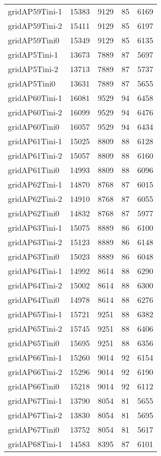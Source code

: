\begin{longtable}{lrrrr}
gridAP59Tini-1 & 15383 & 9129 & 85 & 6169 \\
gridAP59Tini-2 & 15411 & 9129 & 85 & 6197 \\
gridAP59Tini0 & 15349 & 9129 & 85 & 6135 \\
gridAP5Tini-1 & 13673 & 7889 & 87 & 5697 \\
gridAP5Tini-2 & 13713 & 7889 & 87 & 5737 \\
gridAP5Tini0 & 13631 & 7889 & 87 & 5655 \\
gridAP60Tini-1 & 16081 & 9529 & 94 & 6458 \\
gridAP60Tini-2 & 16099 & 9529 & 94 & 6476 \\
gridAP60Tini0 & 16057 & 9529 & 94 & 6434 \\
gridAP61Tini-1 & 15025 & 8809 & 88 & 6128 \\
gridAP61Tini-2 & 15057 & 8809 & 88 & 6160 \\
gridAP61Tini0 & 14993 & 8809 & 88 & 6096 \\
gridAP62Tini-1 & 14870 & 8768 & 87 & 6015 \\
gridAP62Tini-2 & 14910 & 8768 & 87 & 6055 \\
gridAP62Tini0 & 14832 & 8768 & 87 & 5977 \\
gridAP63Tini-1 & 15075 & 8889 & 86 & 6100 \\
gridAP63Tini-2 & 15123 & 8889 & 86 & 6148 \\
gridAP63Tini0 & 15023 & 8889 & 86 & 6048 \\
gridAP64Tini-1 & 14992 & 8614 & 88 & 6290 \\
gridAP64Tini-2 & 15002 & 8614 & 88 & 6300 \\
gridAP64Tini0 & 14978 & 8614 & 88 & 6276 \\
gridAP65Tini-1 & 15721 & 9251 & 88 & 6382 \\
gridAP65Tini-2 & 15745 & 9251 & 88 & 6406 \\
gridAP65Tini0 & 15695 & 9251 & 88 & 6356 \\
gridAP66Tini-1 & 15260 & 9014 & 92 & 6154 \\
gridAP66Tini-2 & 15296 & 9014 & 92 & 6190 \\
gridAP66Tini0 & 15218 & 9014 & 92 & 6112 \\
gridAP67Tini-1 & 13790 & 8054 & 81 & 5655 \\
gridAP67Tini-2 & 13830 & 8054 & 81 & 5695 \\
gridAP67Tini0 & 13752 & 8054 & 81 & 5617 \\
gridAP68Tini-1 & 14583 & 8395 & 87 & 6101 \\

\end{longtable}
